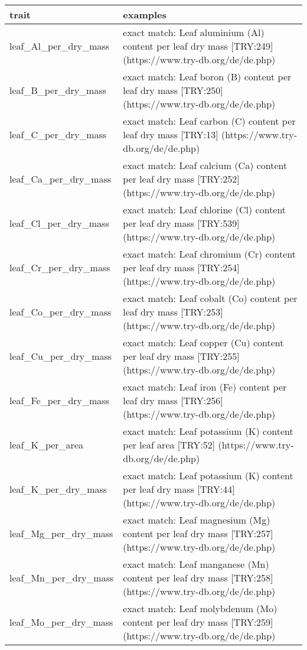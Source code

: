 \documentclass[
  letterpaper,
  DIV=11,
  numbers=noendperiod]{scrartcl}
\begin{document}
\begin{tabular}{>{\raggedright\arraybackslash}p{5cm}>{\raggedright\arraybackslash}p{12cm}}
\toprule
trait & examples\\
\midrule
leaf\_Al\_per\_dry\_mass & exact match: Leaf aluminium (Al) content per leaf dry mass [TRY:249] (https://www.try-db.org/de/de.php)\\
leaf\_B\_per\_dry\_mass & exact match: Leaf boron (B) content per leaf dry mass [TRY:250] (https://www.try-db.org/de/de.php)\\
leaf\_C\_per\_dry\_mass & exact match: Leaf carbon (C) content per leaf dry mass [TRY:13] (https://www.try-db.org/de/de.php)\\
leaf\_Ca\_per\_dry\_mass & exact match: Leaf calcium (Ca) content per leaf dry mass [TRY:252] (https://www.try-db.org/de/de.php)\\
leaf\_Cl\_per\_dry\_mass & exact match: Leaf chlorine (Cl) content per leaf dry mass [TRY:539] (https://www.try-db.org/de/de.php)\\
\addlinespace
leaf\_Cr\_per\_dry\_mass & exact match: Leaf chromium (Cr) content per leaf dry mass [TRY:254] (https://www.try-db.org/de/de.php)\\
leaf\_Co\_per\_dry\_mass & exact match: Leaf cobalt (Co) content per leaf dry mass [TRY:253] (https://www.try-db.org/de/de.php)\\
leaf\_Cu\_per\_dry\_mass & exact match: Leaf copper (Cu) content per leaf dry mass [TRY:255] (https://www.try-db.org/de/de.php)\\
leaf\_Fe\_per\_dry\_mass & exact match: Leaf iron (Fe) content per leaf dry mass [TRY:256] (https://www.try-db.org/de/de.php)\\
leaf\_K\_per\_area & exact match: Leaf potassium (K) content per leaf area [TRY:52] (https://www.try-db.org/de/de.php)\\
\addlinespace
leaf\_K\_per\_dry\_mass & exact match: Leaf potassium (K) content per leaf dry mass [TRY:44] (https://www.try-db.org/de/de.php)\\
leaf\_Mg\_per\_dry\_mass & exact match: Leaf magnesium (Mg) content per leaf dry mass [TRY:257] (https://www.try-db.org/de/de.php)\\
leaf\_Mn\_per\_dry\_mass & exact match: Leaf manganese (Mn) content per leaf dry mass [TRY:258] (https://www.try-db.org/de/de.php)\\
leaf\_Mo\_per\_dry\_mass & exact match: Leaf molybdenum (Mo) content per leaf dry mass [TRY:259] (https://www.try-db.org/de/de.php)\\

\end{tabular}
\end{document}
